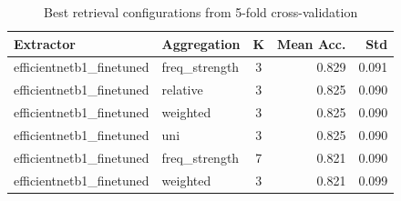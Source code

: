 \begin{table}[ht]
\centering
\caption{Best retrieval configurations from 5-fold cross-validation}
\label{tab:cv_best_configs}
\begin{tabular}{@{}llcrr@{}}
\toprule
Extractor & Aggregation & K & Mean Acc. & Std \\
\midrule
efficientnetb1\_finetuned & freq\_strength & 3 & 0.829 & 0.091 \\
efficientnetb1\_finetuned & relative & 3 & 0.825 & 0.090 \\
efficientnetb1\_finetuned & weighted & 3 & 0.825 & 0.090 \\
efficientnetb1\_finetuned & uni & 3 & 0.825 & 0.090 \\
efficientnetb1\_finetuned & freq\_strength & 7 & 0.821 & 0.090 \\
efficientnetb1\_finetuned & weighted & 3 & 0.821 & 0.099 \\
\bottomrule
\end{tabular}
\end{table}
